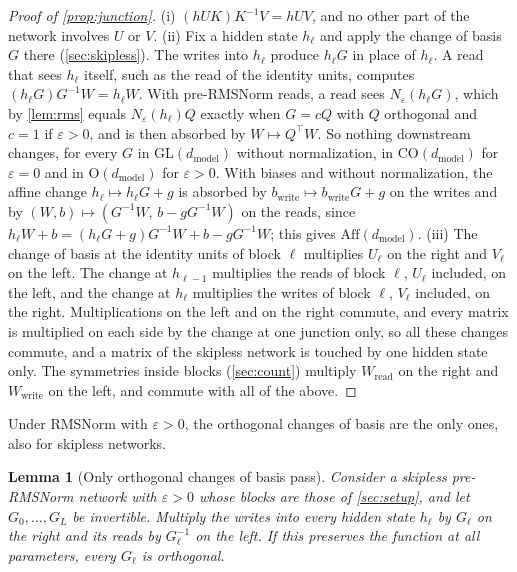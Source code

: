 \documentclass[10pt]{article}
\newtheorem{lemma}[theorem]{Lemma}
\theoremstyle{definition}
\theoremstyle{remark}
\newcommand{\Wread}{W_{\mathrm{read}}}
\newcommand{\Wwrite}{W_{\mathrm{write}}}
\newcommand{\dm}{d_{\mathrm{model}}}
\newcommand{\GL}{\mathrm{GL}}
\newcommand{\Ort}{\mathrm{O}}
\newcommand{\CO}{\mathrm{CO}}
\newcommand{\Aff}{\mathrm{Aff}}
\begin{document}
\begin{proof}[Proof of \cref{prop:junction}]
(i) $(hUK)K^{-1}V = hUV$, and no other part of the network involves $U$ or $V$.
(ii) Fix a hidden state $h_{\ell}$ and apply the change of basis $G$ there (\cref{sec:skipless}). The writes into $h_{\ell}$ produce $h_\ell G$ in place of $h_\ell$. A read that sees $h_\ell$ itself, such as the read of the identity units, computes $(h_\ell G)G^{-1}W = h_\ell W$. With pre-RMSNorm reads, a read sees $N_\varepsilon(h_\ell G)$, which by \cref{lem:rms} equals $N_\varepsilon(h_\ell)Q$ exactly when $G = cQ$ with $Q$ orthogonal and $c = 1$ if $\varepsilon > 0$, and is then absorbed by $W \mapsto Q^\top W$. So nothing downstream changes, for every $G$ in $\GL(\dm)$ without normalization, in $\CO(\dm)$ for $\varepsilon = 0$ and in $\Ort(\dm)$ for $\varepsilon > 0$. With biases and without normalization, the affine change $h_\ell \mapsto h_\ell G + g$ is absorbed by $b_{\mathrm{write}} \mapsto b_{\mathrm{write}}G + g$ on the writes and by $(W, b) \mapsto (G^{-1}W,\, b - gG^{-1}W)$ on the reads, since $h_\ell W + b = (h_\ell G + g)G^{-1}W + b - gG^{-1}W$; this gives $\Aff(\dm)$.
(iii) The change of basis at the identity units of block $\ell$ multiplies $U_\ell$ on the right and $V_\ell$ on the left. The change at $h_{\ell-1}$ multiplies the reads of block $\ell$, $U_\ell$ included, on the left, and the change at $h_\ell$ multiplies the writes of block $\ell$, $V_\ell$ included, on the right. Multiplications on the left and on the right commute, and every matrix is multiplied on each side by the change at one junction only, so all these changes commute, and a matrix of the skipless network is touched by one hidden state only. The symmetries inside blocks (\cref{sec:count}) multiply $\Wread$ on the right and $\Wwrite$ on the left, and commute with all of the above.
\end{proof}

Under RMSNorm with $\varepsilon > 0$, the orthogonal changes of basis are the only ones, also for skipless networks.

\begin{lemma}[Only orthogonal changes of basis pass]\label{lem:onlyorth}
Consider a skipless pre-RMSNorm network with $\varepsilon > 0$ whose blocks are those of \cref{sec:setup}, and let $G_0, \dots, G_L$ be invertible. Multiply the writes into every hidden state $h_\ell$ by $G_\ell$ on the right and its reads by $G_\ell^{-1}$ on the left. If this preserves the function at all parameters, every $G_\ell$ is orthogonal.
\end{lemma}
\end{document}
